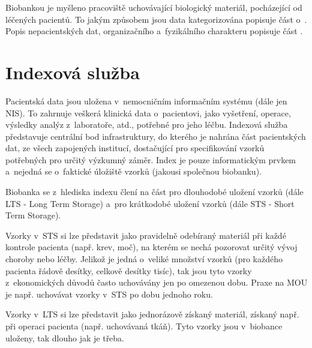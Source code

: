 Biobankou je myšleno pracoviště uchovávající biologický materiál, pocházející od léčených pacientů. To jakým způsobem jsou data kategorizována popisuje část o~. Popis nepacientských dat, organizačního a~fyzikálního charakteru popisuje část .

\section{Indexová služba}
Pacientská data jsou uložena v~nemocničním informačním systému (dále jen NIS). To zahrnuje veškerá klinická data o~pacientovi, jako vyšetření, operace, výsledky analýz z~laboratoře, atd., potřebné pro jeho léčbu. Indexová služba \ProjectName představuje centrální bod infrastruktury, do kterého je nahrána část pacientských dat, ze všech zapojených institucí, dostačující pro specifikování vzorků potřebných pro určitý výzkumný záměr. Index je pouze informatickým prvkem a~nejedná se o~faktické úložiště vzorků (jakousi společnou biobanku).

Biobanka se z~hlediska indexu člení na část pro dlouhodobé uložení vzorků (dále LTS - Long Term Storage) a~pro krátkodobé uložení vzorků (dále STS - Short Term Storage). 

Vzorky v~STS si lze představit jako pravidelně odebíraný materiál při každé kontrole pacienta (např. krev, moč), na kterém se nechá pozorovat určitý vývoj choroby nebo léčby. Jelikož je jedná o~veliké množství vzorků (pro každého pacienta řádově desítky, celkově desítky tisíc), tak jsou tyto vzorky z~ekonomických důvodů často uchovávány jen po omezenou dobu. Praxe na MOU je např. uchovávat vzorky v~STS po dobu jednoho roku.

Vzorky v~LTS si lze představit jako jednorázově získaný materiál, získaný např. při operaci pacienta (např. uchovávaná tkáň). Tyto vzorky jsou v~biobance uloženy, tak dlouho jak je třeba. 

